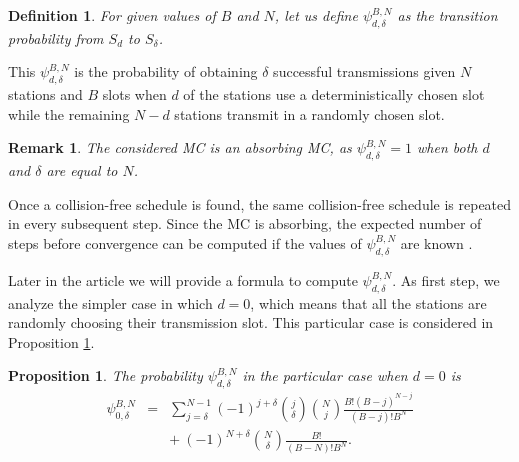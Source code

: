 \documentclass[journal]{IEEEtran}
\newtheorem{definition}{Definition}
\newtheorem{proposition}{Proposition}
\newtheorem{remark}{Remark}
\begin{document}
\begin{definition}
For given values of $B$ and $N$, let us define $\psi_{d,\delta}^{B,N}$ as the transition probability from $S_d$ to $S_\delta$. 
\end{definition}

This $\psi_{d,\delta}^{B,N}$ is the probability of obtaining $\delta$ successful transmissions given $N$ stations and $B$ slots when $d$ of the stations use a deterministically chosen slot while the remaining $N-d$ stations transmit in a randomly chosen slot.

\begin{remark}
The considered MC is an absorbing MC, as $\psi_{d,\delta}^{B,N}=1$ when both $d$ and $\delta$ are equal to $N$.
\end{remark}

Once a collision-free schedule is found, the same collision-free schedule is repeated in every subsequent step.
Since the MC is absorbing, the expected number of steps before convergence can be computed if the values of $\psi_{d,\delta}^{B,N}$ are known \cite{grinstead1997ip}.

Later in the article we will provide a formula to compute $\psi_{d,\delta}^{B,N}$.
As first step, we analyze the simpler case in which $d=0$, which means that all the stations are randomly choosing their transmission slot. 
This particular case is considered in Proposition \ref{pro:zero_case}.

\begin{proposition}
\label{pro:zero_case}
The probability $\psi^{B,N}_{d,\delta}$ in the particular case when $d=0$ is 
\setlength{\arraycolsep}{0.0em}
\begin{eqnarray}
\psi^{B,N}_{0,\delta} & {}={} &\sum_{j=\delta}^{N-1} (-1)^{j+\delta}\binom{j}{\delta} \binom{N}{j}\frac{B! (B-j)^{N-j}}{(B-j)! B^N} \nonumber\\
&&{+}\:(-1)^{N+\delta}\binom{N}{\delta}\frac{B!}{(B-N)!B^N}.
\label{eq:psi_zero}
\end{eqnarray}
\end{proposition}
\end{document}
